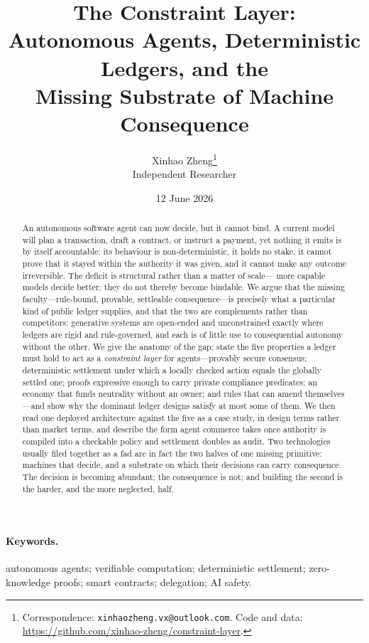 \documentclass[11pt]{article}
\title{\textbf{The Constraint Layer:\\[3pt]
  Autonomous Agents, Deterministic Ledgers, and the\\
  Missing Substrate of Machine Consequence}}
\author{%
  Xinhao Zheng\thanks{Correspondence: \texttt{xinhaozheng.vx@outlook.com}.
    Code and data:
    \url{https://github.com/xinhao-zheng/constraint-layer}.}\\[2pt]
  \small Independent Researcher}
\date{12 June 2026}
\begin{document}
\maketitle

\begin{abstract}
\noindent
An autonomous software agent can now decide, but it cannot bind. A
current model will plan a transaction, draft a contract, or instruct a
payment, yet nothing it emits is by itself accountable: its behaviour is
non-deterministic, it holds no stake, it cannot prove that it stayed
within the authority it was given, and it cannot make any outcome
irreversible. The deficit is structural rather than a matter of scale---
more capable models decide better; they do not thereby become bindable.
We argue that the missing faculty---rule-bound, provable, settleable
consequence---is precisely what a particular kind of public ledger
supplies, and that the two are complements rather than competitors:
generative systems are open-ended and unconstrained exactly where
ledgers are rigid and rule-governed, and each is of little use to
consequential autonomy without the other. We give the anatomy of the
gap; state the five properties a ledger must hold to act as a
\emph{constraint layer} for agents---provably secure consensus;
deterministic settlement under which a locally checked action equals the
globally settled one; proofs expressive enough to carry private
compliance predicates; an economy that funds neutrality without an
owner; and rules that can amend themselves---and show why the dominant
ledger designs satisfy at most some of them. We then read one deployed
architecture against the five as a case study, in design terms rather
than market terms, and describe the form agent commerce takes once
authority is compiled into a checkable policy and settlement doubles as
audit. Two technologies usually filed together as a fad are in fact the
two halves of one missing primitive: machines that decide, and a
substrate on which their decisions can carry consequence. The decision
is becoming abundant; the consequence is not; and building the second is
the harder, and the more neglected, half.
\end{abstract}

\paragraph*{Keywords.} autonomous agents; verifiable computation;
deterministic settlement; zero-knowledge proofs; smart contracts;
delegation; AI safety.
\end{document}
